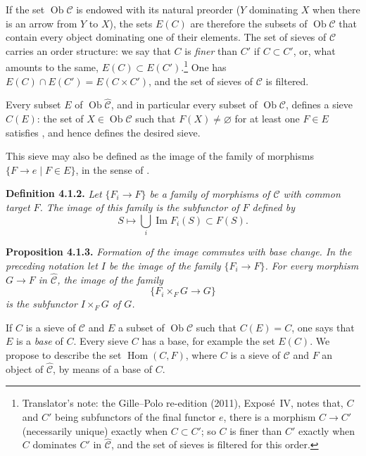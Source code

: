 If the set \(\operatorname{Ob}\mathscr C\) is endowed with its natural
preorder (\(Y\) dominating \(X\) when there is an arrow from \(Y\) to \(X\)),
the sets \(E(C)\) are therefore the subsets of \(\operatorname{Ob}\mathscr C\)
that contain every object dominating one of their elements. The set of sieves
of \(\mathscr C\) carries an order structure: we say that \(C\) is
\emph{finer} than \(C'\) if \(C\subset C'\), or, what amounts to the same,
\(E(C)\subset E(C')\).\footnote{Translator's note: the Gille--Polo re-edition (2011), Expos\'e~IV, notes
that, \(C\) and \(C'\) being subfunctors of the final functor \(e\), there is a
morphism \(C\to C'\) (necessarily unique) exactly when \(C\subset C'\); so
\(C\) is finer than \(C'\) exactly when \(C\) dominates \(C'\) in
\(\widehat{\mathscr C}\), and the set of sieves is filtered for this order.} One has \(E(C)\cap E(C')=E(C\times C')\), and the set
of sieves of \(\mathscr C\) is filtered.

Every subset \(E\) of \(\operatorname{Ob}\widehat{\mathscr C}\), and in
particular every subset of \(\operatorname{Ob}\mathscr C\), defines a sieve
\(C(E)\): the set of \(X\in\operatorname{Ob}\mathscr C\) such that
\(F(X)\ne\varnothing\) for at least one \(F\in E\) satisfies , and hence
defines the desired sieve.

This sieve may also be defined as the image of the family of morphisms
\(\{F\to e\mid F\in E\}\), in the sense of .

\medskip
\noindent{}\textbf{Definition 4.1.2.}
\textit{Let \(\{F_i\to F\}\) be a family of morphisms of
\(\widehat{\mathscr C}\) with common target \(F\). The \emph{image} of this
family is the subfunctor of \(F\) defined by}
\[
 S\longmapsto\bigcup_i\operatorname{Im}F_i(S)\subset F(S).
\]

\medskip
\noindent{}\textbf{Proposition 4.1.3.}
\textit{Formation of the image commutes with base change. In the preceding
notation let \(I\) be the image of the family \(\{F_i\to F\}\). For every
morphism \(G\to F\) in \(\widehat{\mathscr C}\), the image of the family}
\[
 \{F_i\times_FG\longrightarrow G\}
\]
\textit{is the subfunctor \(I\times_FG\) of \(G\).}

If \(C\) is a sieve of \(\mathscr C\) and \(E\) a subset of
\(\operatorname{Ob}\mathscr C\) such that \(C(E)=C\), one says that \(E\) is
a \emph{base} of \(C\). Every sieve \(C\) has a base, for example the set
\(E(C)\). We propose to describe the set \(\operatorname{Hom}(C,F)\), where
\(C\) is a sieve of \(\mathscr C\) and \(F\) an object of
\(\widehat{\mathscr C}\), by means of a base of \(C\).

